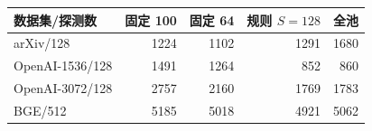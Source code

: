 \begin{tabular}{@{}lrrrr@{}}
\toprule
数据集/探测数 & 固定 100 & 固定 64 & 规则 $S=128$ & 全池 \\
\midrule
arXiv/128 & 1224 & 1102 & 1291 & 1680 \\
OpenAI-1536/128 & 1491 & 1264 & 852 & 860 \\
OpenAI-3072/128 & 2757 & 2160 & 1769 & 1783 \\
BGE/512 & 5185 & 5018 & 4921 & 5062 \\
\bottomrule
\end{tabular}

